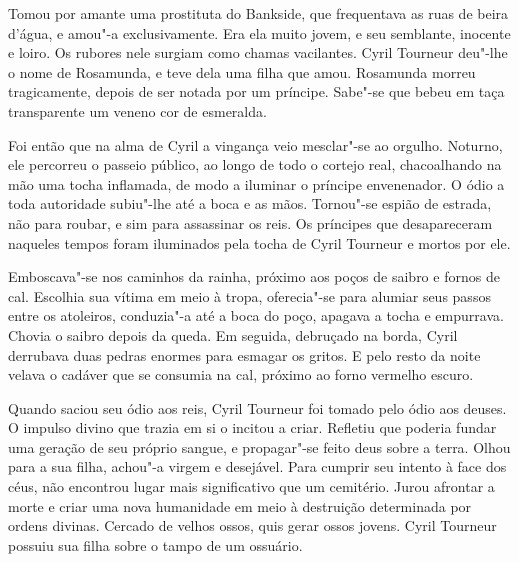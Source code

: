 Tomou por amante uma prostituta do Bankside, que frequentava as ruas de
beira d’água, e amou"-a exclusivamente. Era ela muito jovem, e seu
semblante, inocente e loiro. Os rubores nele surgiam como chamas
vacilantes. Cyril Tourneur deu"-lhe o nome de Rosamunda, e teve dela uma
filha que amou. Rosamunda morreu tragicamente, depois de ser notada por um
príncipe. Sabe"-se que bebeu em taça transparente um veneno cor de
esmeralda.

Foi então que na alma de Cyril a vingança veio mesclar"-se ao orgulho.
Noturno, ele percorreu o passeio público, ao longo de todo o cortejo real,
chacoalhando na mão uma tocha inflamada, de modo a iluminar o príncipe
envenenador. O ódio a toda autoridade subiu"-lhe até a boca e as mãos.
Tornou"-se espião de estrada, não para roubar, e sim para assassinar os
reis. Os príncipes que desapareceram naqueles tempos foram iluminados pela
tocha de Cyril Tourneur e mortos por ele.

Emboscava"-se nos caminhos da rainha, próximo aos poços de saibro e fornos
de cal. Escolhia sua vítima em meio à tropa, oferecia"-se para alumiar seus
passos entre os atoleiros, conduzia"-a até a boca do poço, apagava a tocha
e empurrava. Chovia o saibro depois da queda. Em seguida, debruçado na
borda, Cyril derrubava duas pedras enormes para esmagar os gritos. E pelo
resto da noite velava o cadáver que se consumia na cal, próximo ao forno
vermelho escuro.

Quando saciou seu ódio aos reis, Cyril Tourneur foi tomado pelo ódio aos
deuses. O impulso divino que trazia em si o incitou a criar. Refletiu que
poderia fundar uma geração de seu próprio sangue, e propagar"-se feito deus
sobre a terra. Olhou para a sua filha, achou"-a virgem e desejável. Para
cumprir seu intento à face dos céus, não encontrou lugar mais
significativo que um cemitério. Jurou afrontar a morte e criar uma nova
humanidade em meio à destruição determinada por ordens divinas. Cercado de
velhos ossos, quis gerar ossos jovens. Cyril Tourneur possuiu sua filha
sobre o tampo de um ossuário.

